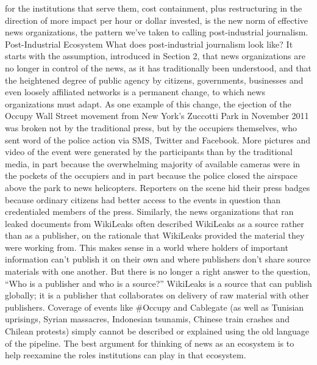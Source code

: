 for the institutions that serve them, cost containment, plus restructuring in the
direction of more impact per hour or dollar invested, is the new norm of effective
news organizations, the pattern we’ve taken to calling post-industrial journalism.
Post-Industrial Ecosystem
What does post-industrial journalism look like? It starts with the assumption,
introduced in Section 2, that news organizations are no longer in control of the
news, as it has traditionally been understood, and that the heightened degree of
public agency by citizens, governments, businesses and even loosely affiliated
networks is a permanent change, to which news organizations must adapt.
As one example of this change, the ejection of the Occupy Wall Street movement
from New York’s Zuccotti Park in November 2011 was broken not by the traditional
press, but by the occupiers themselves, who sent word of the police action
via SMS, Twitter and Facebook. More pictures and video of the event were generated
by the participants than by the traditional media, in part because the overwhelming
majority of available cameras were in the pockets of the occupiers and
in part because the police closed the airspace above the park to news helicopters.
Reporters on the scene hid their press badges because ordinary citizens had better
access to the events in question than credentialed members of the press.
Similarly, the news organizations that ran leaked documents from WikiLeaks
often described WikiLeaks as a source rather than as a publisher, on the rationale
that WikiLeaks provided the material they were working from. This makes sense
in a world where holders of important information can’t publish it on their own
and where publishers don’t share source materials with one another. But there
is no longer a right answer to the question, ``Who is a publisher and who is a
source?'' WikiLeaks is a source that can publish globally; it is a publisher that collaborates
on delivery of raw material with other publishers.
Coverage of events like #Occupy and Cablegate (as well as Tunisian uprisings,
Syrian massacres, Indonesian tsunamis, Chinese train crashes and Chilean protests)
simply cannot be described or explained using the old language of the
pipeline. The best argument for thinking of news as an ecosystem is to help reexamine
the roles institutions can play in that ecosystem.


